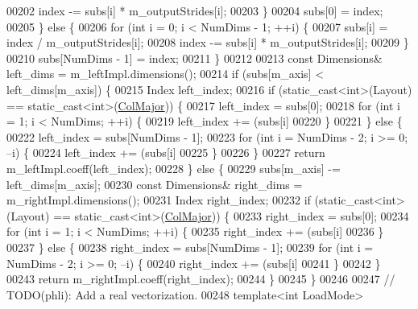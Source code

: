 \begin{DoxyCode}
00202         index -= subs[i] * m\_outputStrides[i];
00203       \}
00204       subs[0] = index;
00205     \} \textcolor{keywordflow}{else} \{
00206       \textcolor{keywordflow}{for} (\textcolor{keywordtype}{int} i = 0; i < NumDims - 1; ++i) \{
00207         subs[i] = index / m\_outputStrides[i];
00208         index -= subs[i] * m\_outputStrides[i];
00209       \}
00210       subs[NumDims - 1] = index;
00211     \}
00212 
00213     \textcolor{keyword}{const} Dimensions& left\_dims = m\_leftImpl.dimensions();
00214     \textcolor{keywordflow}{if} (subs[m\_axis] < left\_dims[m\_axis]) \{
00215       Index left\_index;
00216       \textcolor{keywordflow}{if} (static\_cast<int>(Layout) == static\_cast<int>(\hyperlink{group__enums_ggaacded1a18ae58b0f554751f6cdf9eb13a0cbd4bdd0abcfc0224c5fcb5e4f6669a}{ColMajor})) \{
00217         left\_index = subs[0];
00218         \textcolor{keywordflow}{for} (\textcolor{keywordtype}{int} i = 1; i < NumDims; ++i) \{
00219           left\_index += (subs[i] %
00220         \}
00221       \} \textcolor{keywordflow}{else} \{
00222         left\_index = subs[NumDims - 1];
00223         \textcolor{keywordflow}{for} (\textcolor{keywordtype}{int} i = NumDims - 2; i >= 0; --i) \{
00224           left\_index += (subs[i] %
00225         \}
00226       \}
00227       \textcolor{keywordflow}{return} m\_leftImpl.coeff(left\_index);
00228     \} \textcolor{keywordflow}{else} \{
00229       subs[m\_axis] -= left\_dims[m\_axis];
00230       \textcolor{keyword}{const} Dimensions& right\_dims = m\_rightImpl.dimensions();
00231       Index right\_index;
00232       \textcolor{keywordflow}{if} (static\_cast<int>(Layout) == static\_cast<int>(\hyperlink{group__enums_ggaacded1a18ae58b0f554751f6cdf9eb13a0cbd4bdd0abcfc0224c5fcb5e4f6669a}{ColMajor})) \{
00233         right\_index = subs[0];
00234         \textcolor{keywordflow}{for} (\textcolor{keywordtype}{int} i = 1; i < NumDims; ++i) \{
00235           right\_index += (subs[i] %
00236         \}
00237       \} \textcolor{keywordflow}{else} \{
00238         right\_index = subs[NumDims - 1];
00239         \textcolor{keywordflow}{for} (\textcolor{keywordtype}{int} i = NumDims - 2; i >= 0; --i) \{
00240           right\_index += (subs[i] %
00241         \}
00242       \}
00243       \textcolor{keywordflow}{return} m\_rightImpl.coeff(right\_index);
00244     \}
00245   \}
00246 
00247   \textcolor{comment}{// TODO(phli): Add a real vectorization.}
00248   \textcolor{keyword}{template}<\textcolor{keywordtype}{int} LoadMode>

\end{DoxyCode}
